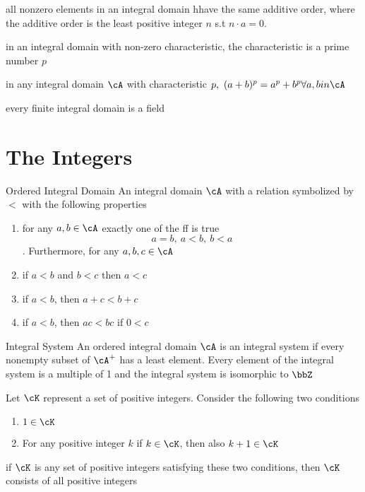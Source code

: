 \documentclass[11pt, oneside, dvipdfmx]{book}
\begin{document}
\begin{MyTheorem}
all nonzero elements in an integral domain hhave the same additive order, where the additive order is the least positive  integer $n$ s.t $n \cdot a = 0$. 
\end{MyTheorem}

\begin{MyTheorem}
in an integral domain with non-zero characteristic, the characteristic is a prime number $p$
\end{MyTheorem}

\begin{MyTheorem}
in any integral domain $\cA$ with characteristic $p,~(a+b)^p=a^p + b^p \forall a,b in \cA$
\end{MyTheorem}

\begin{MyTheorem}
every finite integral domain is a field
\end{MyTheorem}

\section{The Integers}
\begin{MyDefinition}{Ordered Integral Domain}
An integral domain $\cA$ with a relation symbolized by $<$ with the following properties
\begin{enumerate}
\item for any $a,b \in \cA$ exactly one of the ff is true
$$a=b,~a<b,~b<a$$. Furthermore, for any $a,b,c \in \cA$
\item if $a <b $ and $b < c$ then $a < c$
\item if $a < b$, then $a+c < b+c$
\item if $a<b$, then $ac <bc$ if $0<c$
\end{enumerate}
\end{MyDefinition}

\begin{MyDefinition}{Integral System}
An ordered integral domain $\cA$ is an integral system if every nonempty subset of $\cA^+$ has a least element. \newline Every element of the integral system is a multiple of 1 and the integral system is isomorphic to $\bbZ$
\end{MyDefinition}

\begin{MyTheorem}
Let $\cK$ represent a set of positive integers. Consider the following two conditions
\begin{enumerate}
\item $1 \in \cK$

\item For any positive integer $k$ if $k \in \cK$, then also $k + 1 \in \cK$
\end{enumerate}

if $\cK$ is any set of positive integers satisfying these two conditions, then $\cK$ consists of all positive integers
\end{MyTheorem}
\end{document}
